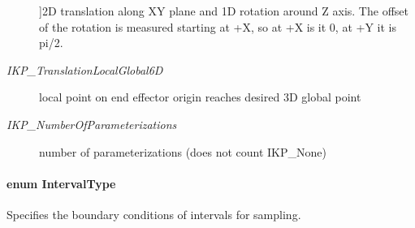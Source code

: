 \begin{Desc}
\begin{description}
{\label{namespaceOpenRAVE_a16f7833e516a35d385ac594a44e44a2eacb13532b686d552c5a513aa5296a9465}
}]2D translation along XY plane and 1D rotation around Z axis. The offset of the rotation is measured starting at +X, so at +X is it 0, at +Y it is pi/2. \item[{\em 
\hypertarget{namespaceOpenRAVE_a16f7833e516a35d385ac594a44e44a2ea3acb8e5a6b84403f23286a338c46e5a7}{
IKP\_\-TranslationLocalGlobal6D}
\label{namespaceOpenRAVE_a16f7833e516a35d385ac594a44e44a2ea3acb8e5a6b84403f23286a338c46e5a7}
}]local point on end effector origin reaches desired 3D global point \item[{\em 
\hypertarget{namespaceOpenRAVE_a16f7833e516a35d385ac594a44e44a2eafc80ee4dec1e8de5665d49e6f4bb8d84}{
IKP\_\-NumberOfParameterizations}
\label{namespaceOpenRAVE_a16f7833e516a35d385ac594a44e44a2eafc80ee4dec1e8de5665d49e6f4bb8d84}
}]number of parameterizations (does not count IKP\_\-None) \end{description}
\end{Desc}

\hypertarget{namespaceOpenRAVE_a0d04dbfb6240509e26f8336ab1756937}{
\paragraph[{IntervalType}]{\setlength{\rightskip}{0pt plus 5cm}enum {\bf IntervalType}}\hfill}
\label{namespaceOpenRAVE_a0d04dbfb6240509e26f8336ab1756937}


Specifies the boundary conditions of intervals for sampling. 

